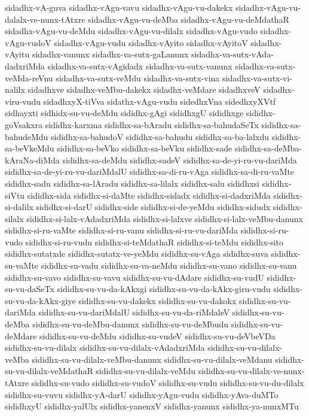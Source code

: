 {sidadhx-vA-guva
sidadhx-vAgu-vavu
sidadhx-vAgu-vu-dakekx
sidadhx-vAgu-vu-dalalx-ve-nunx-tAtxre
sidadhx-vAgu-vu-deMba
sidadhx-vAgu-vu-deMdathaR
sidadhx-vAgu-vu-deMdu
sidadhx-vAgu-vu-dilalx
sidadhx-vAgu-vudo
sidadhx-vAgu-vudoV
sidadhx-vAgu-vudu
sidadhx-vAyito
sidadhx-vAyitoV
sidadhx-vAyitu
sidadhx-vanunx
sidadhx-va-sutx-gaLanunx
sidadhx-va-sutx-vAda-dadxriMda
sidadhx-va-sutx-vAgidadx
sidadhx-va-sutx-vanunx
sidadhx-va-sutx-veMda-reVnu
sidadhx-va-sutx-veMdu
sidadhx-va-sutx-vina
sidadhx-va-sutx-vi-nalilx
sidadhxve
sidadhx-veMbu-dakekx
sidadhx-veMdare
sidadhxveV
sidadhx-viru-vudu
sidadhxyX-tiVva
sidathx-vAgu-vudu
sidedhxVna
sidedhxyXVtf
sidhayxti
sidhidx-su-vu-deMdu
sididhx-gAgi
sididhxgU
sididhxge
sididhx-goVsakxra
sididhx-karxma
sididhx-sa-bAradu
sididhx-sa-bahudaSeTx
sididhx-sa-bahudeMdu
sididhx-sa-bahudoV
sididhx-sa-bahudu
sididhx-sa-ba-lalxdu
sididhx-sa-beVkeMdu
sididhx-sa-beVko
sididhx-sa-beVku
sididhx-sade
sididhx-sa-deMba-kAraNa-diMda
sididhx-sa-deMdu
sididhx-sadeV
sididhx-sa-de-yi-ru-vu-dariMda
sididhx-sa-de-yi-ru-vu-dariMdalU
sididhx-sa-di-ru-vAga
sididhx-sa-di-ru-vaMte
sididhx-sadu
sididhx-sa-lAradu
sididhx-sa-lilalx
sididhx-salu
sididhxsi
sididhx-siVtu
sididhx-sida
sididhx-si-daMte
sididhx-sidadx
sididhx-si-dadxriMda
sididhx-si-dalilx
sididhx-si-darU
sididhx-side
sididhx-si-de-yeMdu
sididhx-sidudx
sididhx-silalx
sididhx-si-lalx-vAdadxriMda
sididhx-si-lalxve
sididhx-si-lalx-veMbu-danunx
sididhx-si-ru-vaMte
sididhx-si-ru-vanu
sididhx-si-ru-vu-dariMda
sididhx-si-ru-vudo
sididhx-si-ru-vudu
sididhx-si-teMdathaR
sididhx-si-teMdu
sididhx-sito
sididhx-sutatxde
sididhx-sutatx-ve-yeMdu
sididhx-su-vAga
sididhx-suva
sididhx-su-vaMte
sididhx-su-vadu
sididhx-su-va-neMdu
sididhx-su-vano
sididhx-su-vanu
sididhx-su-vavo
sididhx-su-vavu
sididhx-su-vu-dAdare
sididhx-su-vudU
sididhx-su-vu-daSeTx
sididhx-su-vu-da-kAkxgi
sididhx-su-vu-da-kAkx-giru-vudu
sididhx-su-vu-da-kAkx-giye
sididhx-su-vu-dakekx
sididhx-su-vu-dakokx
sididhx-su-vu-dariMda
sididhx-su-vu-dariMdalU
sididhx-su-vu-da-riMdaleV
sididhx-su-vu-deMba
sididhx-su-vu-deMbu-danunx
sididhx-su-vu-deMbudu
sididhx-su-vu-deMdare
sididhx-su-vu-deMdu
sididhx-su-vudeV
sididhx-su-vu-deVbeVDa
sididhx-su-vu-dilalx
sididhx-su-vu-dilalx-vAdadxriMda
sididhx-su-vu-dilalx-veMba
sididhx-su-vu-dilalx-veMbu-danunx
sididhx-su-vu-dilalx-veMdanu
sididhx-su-vu-dilalx-veMdathaR
sididhx-su-vu-dilalx-veMdu
sididhx-su-vu-dilalx-ve-nunx-tAtxre
sididhx-su-vudo
sididhx-su-vudoV
sididhx-su-vudu
sididhx-su-vu-du-dilalx
sididhx-su-vuvu
sididhx-yA-darU
sididhx-yAgu-vudu
sididhx-yAva-duMTo
sididhxyU
sididhx-yalUlx
sididhx-yanenxV
sididhx-yanunx
sididhx-ya-nunxMTu
}
